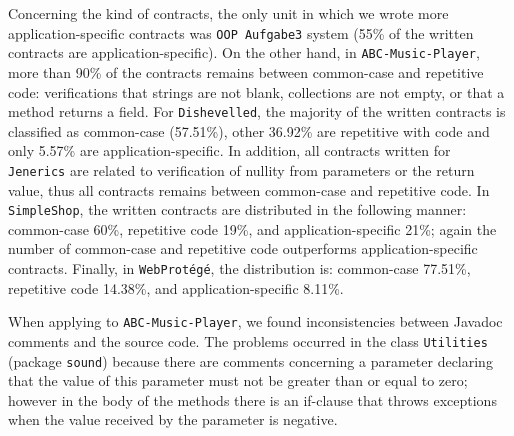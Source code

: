 
Concerning the kind of contracts, the only unit in which we wrote more
application-specific contracts was \texttt{OOP Aufgabe3} system (55\% of the
written contracts are application-specific). On the other hand, in \texttt{ABC-Music-Player}, more than 90\% of the contracts remains between common-case and
repetitive code: verifications that strings are not blank, collections are not
empty, or that a method returns a field.
For \texttt{Dishevelled}, the majority of the written contracts is classified as common-case
(57.51\%), other 36.92\% are repetitive with code and only 5.57\% are application-specific.
In addition, all contracts written for \texttt{Jenerics} are related to
verification of nullity from parameters or the return value, thus all contracts
remains between common-case and repetitive code. In \texttt{SimpleShop}, the
written contracts are distributed in the following manner: common-case 60\%, repetitive code 19\%, and application-specific 21\%; again the number of common-case and repetitive code outperforms application-specific contracts. Finally,
in \texttt{WebProt\'{e}g\'{e}}, the distribution is: common-case 77.51\%, repetitive code 14.38\%, and application-specific 8.11\%.  

When applying \contractjdoc{} to \texttt{ABC-Music-Player}, we found inconsistencies between Javadoc
comments and the source code. The problems occurred in the class \texttt{Utilities} (package
\texttt{sound}) because there are comments concerning a parameter declaring that the value of
this parameter must not be greater than or equal to zero; however in the body of the methods there
is an if-clause that throws exceptions when the value received by the parameter is negative.




